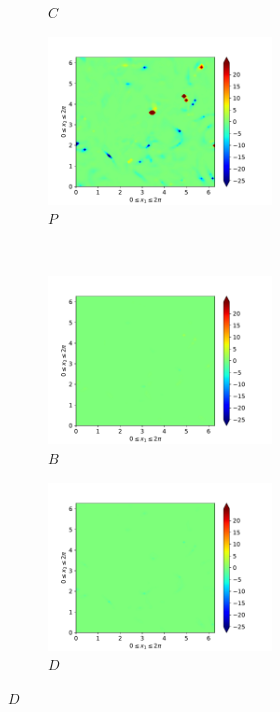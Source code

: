 \begin{figure}[H]
\begin{subfigure}{0.45\textwidth}
        \caption{$C$}
    \end{subfigure}
    \newline
    \begin{subfigure}{0.45\textwidth}
        \includegraphics[height=1.75in]{media/run-cds-65/P-ke-1360}
        \caption{$P$}
    \end{subfigure}
    ~
    \begin{subfigure}{0.45\textwidth}
        \includegraphics[height=1.75in]{media/run-cds-65/B-ke-1360}
        \caption{$B$}
    \end{subfigure}
    \newline
    \begin{subfigure}{0.45\textwidth}
        \includegraphics[height=1.75in]{media/run-cds-65/D-ke-1360}
        \caption{$D$}
    \end{subfigure}
\end{figure}

